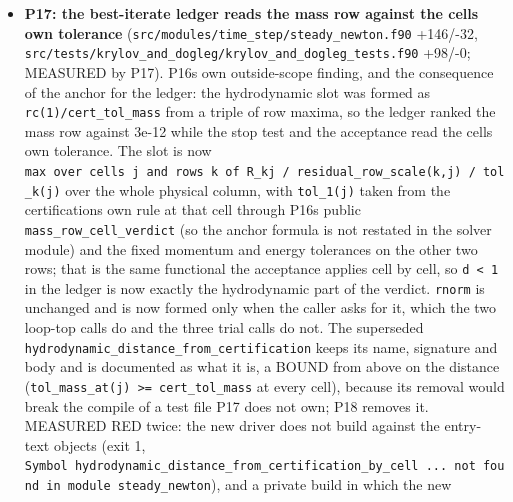 \documentclass[english,a4paper]{my_memo}
\begin{document}
\begin{itemize}
  refusal has moved from rounding to signal. The H2 carrier row is unchanged
  pass by pass in both builds (7.38E-02 at cell 290, 7.22E-02 at 289, 7.06E-02 at
  288), and the three passes cost 15.47 s against the control\textquotesingle s 69.39 s. The
  derivation, both candidate estimates, the measured ratios and all three
  impact measurements are the appended section \textbf{"Anchor (6), 2026-09-11: the
  mass row\textquotesingle s rounding floor"} of
  \texttt{docs/certification\_tolerance\_anchoring\_20260910.md}; its nine earlier
  sections are byte-identical.
\item
  \textbf{P17: the best-iterate ledger reads the mass row against the cell\textquotesingle s own
  tolerance} (\texttt{src/modules/time\_step/steady\_newton.f90} +146/-32,
  \texttt{src/tests/krylov\_and\_dogleg/krylov\_and\_dogleg\_tests.f90} +98/-0; MEASURED by
  P17). P16\textquotesingle s own outside-scope finding, and the consequence of the anchor for
  the ledger: the hydrodynamic slot was formed as \texttt{rc(1)/cert\_tol\_mass} from a
  triple of row maxima, so the ledger ranked the mass row against 3e-12 while
  the stop test and the acceptance read the cell\textquotesingle s own tolerance. The slot is
  now \texttt{max\ over\ cells\ j\ and\ rows\ k\ of\ \textbar{}R\_kj\textbar{}\ /\ residual\_row\_scale(k,j)\ /\ tol\_k(j)} over the whole physical column, with \texttt{tol\_1(j)} taken from the
  certification\textquotesingle s own rule at that cell through P16\textquotesingle s public
  \texttt{mass\_row\_cell\_verdict} (so the anchor formula is not restated in the solver
  module) and the fixed momentum and energy tolerances on the other two rows;
  that is the same functional the acceptance applies cell by cell, so \texttt{d\ \textless{}\ 1}
  in the ledger is now exactly the hydrodynamic part of the verdict. \texttt{rnorm} is
  unchanged and is now formed only when the caller asks for it, which the two
  loop-top calls do and the three trial calls do not. The superseded
  \texttt{hydrodynamic\_distance\_from\_certification} keeps its name, signature and body
  and is documented as what it is, a BOUND from above on the distance
  (\texttt{tol\_mass\_at(j)\ \textgreater{}=\ cert\_tol\_mass} at every cell), because its removal would
  break the compile of a test file P17 does not own; P18 removes it. MEASURED
  RED twice: the new driver does not build against the entry-text objects
  (exit 1, \texttt{Symbol\ \textquotesingle{}hydrodynamic\_distance\_from\_certification\_by\_cell\textquotesingle{}\ ...\ not\ found\ in\ module\ \textquotesingle{}steady\_newton\textquotesingle{}}), and a private build in which the new

\end{itemize}
\end{document}
